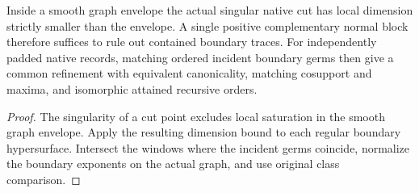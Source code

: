 \begin{theorem}
\label{hir:g1-positive-graph-boundary-comparison}
\leanok
Inside a smooth graph envelope the actual singular native cut
has local dimension strictly smaller than the envelope. A single
positive complementary normal block therefore suffices to rule
out contained boundary traces. For independently padded native
records, matching ordered incident boundary germs then give a
common refinement with equivalent canonicality, matching
cosupport and maxima, and isomorphic attained recursive orders.
\end{theorem}
\begin{proof}
The singularity of a cut point excludes local saturation in the
smooth graph envelope. Apply the resulting dimension bound to
each regular boundary hypersurface. Intersect the windows where
the incident germs coincide, normalize the boundary exponents
on the actual graph, and use original class comparison.
\end{proof}

